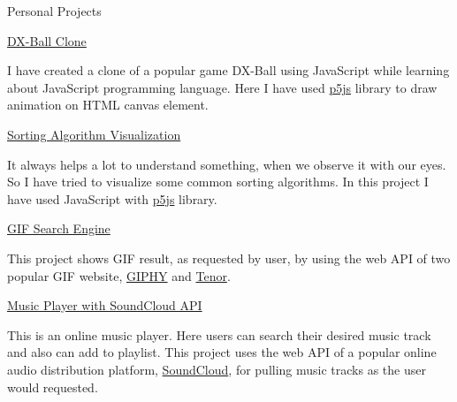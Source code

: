 \documentclass{article}
\newlength{\tabin}
\newlength{\secsep}
\newcommand{\lineunder}{\vspace*{-8pt} \\ \hspace*{-6pt} \hrulefill \\ \vspace*{-15pt}}
\newenvironment{tabbedsection}[1]{
  \begin{list}{}{
      \setlength{\itemsep}{0pt}
      \setlength{\labelsep}{0pt}
      \setlength{\labelwidth}{0pt}
      \setlength{\leftmargin}{\tabin}
      \setlength{\rightmargin}{\tabin}
      \setlength{\listparindent}{0pt}
      \setlength{\parsep}{0pt}
      \setlength{\parskip}{0pt}
      \setlength{\partopsep}{0pt}
      \setlength{\topsep}{#1}
    }
  \item[]
}{\end{list}}
\newenvironment{resume_section}[1]{
  \filbreak
  \vspace{2\secsep}
  \textsc{\large#1}
  \lineunder
  \begin{tabbedsection}{\secsep}
}{\end{tabbedsection}}
\newenvironment{resume_subsection}[2][]{
  \textbf{#2} \hfill {\footnotesize #1} \hspace{2em}
  \begin{tabbedsection}{0.5\secsep}
}{\end{tabbedsection}}
\newenvironment{subitems}{
  \renewcommand{\labelitemi}{-}
  \begin{itemize}
      \setlength{\labelsep}{1em}
}{\end{itemize}}
\begin{document}
\begin{resume_section}{Personal Projects}
  \begin{resume_subsection}[(August 2020)]{\href{https://ehsanulkarim.me/dx_ball_clone}{DX-Ball Clone}}
    \begin{subitems}
       I have created a clone of a popular game DX-Ball using JavaScript while learning about JavaScript programming language. Here I have used \href{https://p5js.org/}{p5js} library to draw animation on HTML canvas element.
    \end{subitems}
  \end{resume_subsection}


  \begin{resume_subsection}[(September 2020)]{\href{https://ehsanulkarim.me/sorting_algo_visualization}{Sorting Algorithm Visualization}}
    \begin{subitems}
      It always helps a lot to understand something, when we observe it with our eyes. So I have tried to visualize some common sorting algorithms. In this project I have used JavaScript with \href{https://p5js.org/}{p5js} library.
     \end{subitems}
  \end{resume_subsection}
  
  \begin{resume_subsection}[(January 2021)]{\href{https://ehsanulkarim.me/gif_search_engine/}{GIF Search Engine}}
    \begin{subitems}
      This project shows GIF result, as requested by user, by using the web API of two popular GIF website, \href{https://giphy.com/}{GIPHY} and \href{https://tenor.com/}{Tenor}.
    \end{subitems}
  \end{resume_subsection}


  \begin{resume_subsection}[(January 2021)]{\href{https://ehsanulkarim.me/onemonth/JAVASCRIPT/SoundCloudPlayer}{Music Player with SoundCloud API}}
    \begin{subitems}
      This is an online music player. Here users can search their desired music track and also can add to playlist. This project uses the web API of a popular online audio distribution platform, \href{https://soundcloud.com/}{SoundCloud}, for pulling music tracks as the user would requested.
    \end{subitems}    
  \end{resume_subsection}



\end{resume_section}
\end{document}
